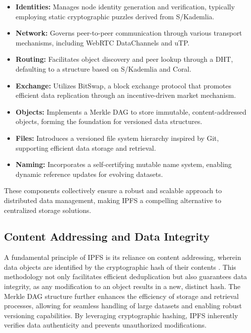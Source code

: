\documentclass[final]{rc-book-2.14}
\begin{document}
\begin{itemize}
    \item \textbf{Identities:} Manages node identity generation and verification, typically employing static cryptographic puzzles derived from S/Kademlia.
    \item \textbf{Network:} Governs peer-to-peer communication through various transport mechanisms, including WebRTC DataChannels and uTP.
    \item \textbf{Routing:} Facilitates object discovery and peer lookup through a DHT, defaulting to a structure based on S/Kademlia and Coral.
    \item \textbf{Exchange:} Utilizes BitSwap, a block exchange protocol that promotes efficient data replication through an incentive-driven market mechanism.
    \item \textbf{Objects:} Implements a Merkle DAG to store immutable, content-addressed objects, forming the foundation for versioned data structures.
    \item \textbf{Files:} Introduces a versioned file system hierarchy inspired by Git, supporting efficient data storage and retrieval.
    \item \textbf{Naming:} Incorporates a self-certifying mutable name system, enabling dynamic reference updates for evolving datasets.
\end{itemize}

These components collectively ensure a robust and scalable approach to distributed data management, making IPFS a compelling alternative to centralized storage solutions.

\subsection{Content Addressing and Data Integrity}

A fundamental principle of IPFS is its reliance on content addressing, wherein data objects are identified by the cryptographic hash of their contents \cite{benet2014ipfs}. This methodology not only facilitates efficient deduplication but also guarantees data integrity, as any modification to an object results in a new, distinct hash. The Merkle DAG structure further enhances the efficiency of storage and retrieval processes, allowing for seamless handling of large datasets and enabling robust versioning capabilities. By leveraging cryptographic hashing, IPFS inherently verifies data authenticity and prevents unauthorized modifications.
\end{document}
